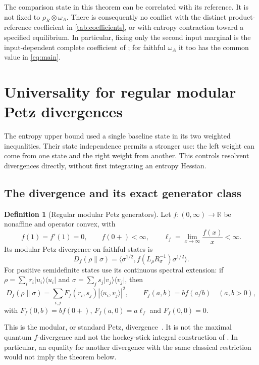 \documentclass[11pt]{article}
\numberwithin{equation}{section}
\theoremstyle{definition}
\newtheorem{definition}[theorem]{Definition}
\theoremstyle{remark}
\newcommand{\ket}[1]{\lvert #1\rangle}
\newcommand{\bra}[1]{\langle #1\rvert}
\newcommand{\ip}[2]{\langle #1,#2\rangle}
\begin{document}
The comparison state in this theorem can be correlated with its reference.
It is not fixed to $\rho_R\otimes\omega_A$.
There is consequently no conflict with the distinct product-reference
coefficient in \cref{tab:coefficients}, or with entropy contraction toward a
specified equilibrium.
In particular, fixing only the second input marginal is the
input-dependent complete coefficient of \cite[Definition~12]{GHNW26};
for faithful $\omega_A$ it too has the common value in \eqref{eq:main}.

\section{Universality for regular modular Petz divergences}
\label{sec:petz}

The entropy upper bound used a single baseline state in its two weighted
inequalities. Their state independence permits a stronger use: the left
weight can come from one state and the right weight from another. This
controls resolvent divergences directly, without first integrating an
entropy Hessian.

\subsection{The divergence and its exact generator class}

\begin{definition}[Regular modular Petz generators]
\label{def:regular-f}
Let $f:(0,\infty)\to\mathbb R$ be nonaffine and operator convex, with
\[
 f(1)=f'(1)=0,\qquad f(0+)<\infty,\qquad
 \ell_f=\lim_{x\to\infty}\frac{f(x)}x<\infty.
\]
Its modular Petz divergence on faithful states is
\begin{equation}
 D_f(\rho\|\sigma)=
 \ip{\sigma^{1/2}}{f(L_\rho R_\sigma^{-1})\sigma^{1/2}}.
 \label{eq:modular-petz}
\end{equation}
For positive semidefinite states use its continuous spectral extension:
if $\rho=\sum_i r_i\ket{u_i}\bra{u_i}$ and
$\sigma=\sum_j s_j\ket{v_j}\bra{v_j}$, then
\[
 D_f(\rho\|\sigma)=
 \sum_{i,j}F_f(r_i,s_j)|\ip{u_i}{v_j}|^2,
 \qquad F_f(a,b)=b f(a/b)\quad(a,b>0),
\]
with $F_f(0,b)=bf(0+)$, $F_f(a,0)=a\ell_f$ and $F_f(0,0)=0$.
\end{definition}

This is the modular, or standard Petz, divergence~\cite{Petz86}. It is not the maximal
quantum $f$-divergence and not the hockey-stick integral construction
of \cite{HT24}. In particular, an equality for another divergence with the
same classical restriction would not imply the theorem below.
\end{document}
